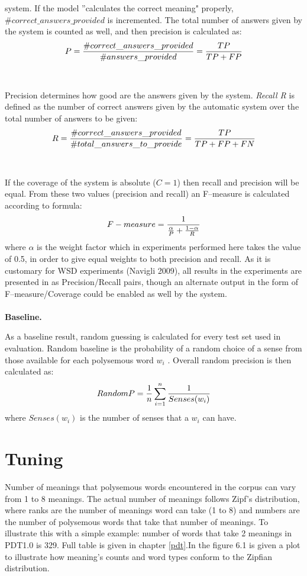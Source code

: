 system. If the model ''calculates the correct meaning" properly, 
\\$\#correct\_answers\_provided$ is 
incremented. The total number of answers given by the system is counted as well, and then precision 
is calculated as: 
\begin{equation}
\large{P=\frac{\#correct\_answers\_provided}{\#answers\_provided}=\frac{TP}{TP+FP}
}
\end{equation}
\\\\
Precision determines how good are the answers given by the system.
\textit{Recall R} is defined as the number of correct answers given by the automatic system
over the total number of answers to be given:
\begin{equation}
\large{
R=\frac{\#correct\_answers\_provided}{\#total\_answers\_to\_provide}=\frac{TP}{TP+FP+FN}
}
\end{equation}
\\\\
If the coverage of the system is absolute ($C=1$) then recall and precision will be equal. 
From these two values (precision and recall) an F--measure is calculated according to formula:
\begin{equation}
\large{
F-measure=\large{\frac{1}{\frac{\alpha}{P}+\frac{1-\alpha}{R}}}
}
\end{equation}
where $\alpha$ is the weight factor which in experiments performed here takes the value of 0.5, in order to give equal weights 
to both precision and recall. As it is customary for WSD experiments (Navigli 2009), all results in the experiments are presented in 
as Precision/Recall pairs, though an alternate output in the form of F--measure/Coverage could be enabled as well by the 
system.   
\\\\
\textbf{Baseline.}

As a baseline result, random guessing is calculated for every test set used in evaluation. Random baseline is the probability of a 
random choice of a sense from those available for each polysemous word $w_i$ . Overall random 
precision is then calculated as:
\begin{equation}
\large{
RandomP=\frac{1}{n} \sum_{i=1}^{n}\frac{1}{Senses(w_i)}
}
\end{equation}
where $Senses(w_i)$ is the number of senses that a $w_i$ can have. 

\section{Tuning}
Number of meanings that polysemous words encountered in the corpus can vary from 1 to 8 meanings. The actual number of meanings follows Zipf's distribution, where ranks are the number of meanings word 
can take (1 to 8) and numbers are the number of polysemous words that take that number of meanings. 
To illustrate this with a simple example: number of words that take 2 meanings in PDT1.0 is 329. 
Full table is given in chapter \ref{pdt}.In the figure 6.1 is given a plot to illustrate how meaning's counts and word 
types conform to the Zipfian distribution.

